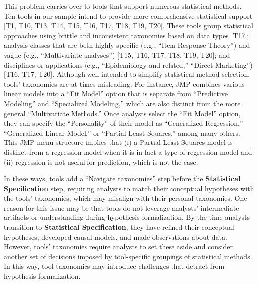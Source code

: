 This problem carries over to tools that support numerous statistical methods.
Ten tools in our sample intend to provide more comprehensive statistical support
[T1, T10, T13, T14, T15, T16, T17, T18, T19, T20]. These tools group statistical
approaches using brittle and inconsistent taxonomies based on data types [T17];
analysis classes that are both highly specific (e.g., ``Item
Response Theory'') and vague (e.g., ``Multivariate analyses'') [T15, T16, T17,
T18, T19, T20]; and disciplines or applications (e.g., ``Epidemiology and
related,'' ``Direct Marketing'') [T16, T17, T20]. Although well-intended to
simplify statistical method selection, tools' taxonomies are at times
misleading. For instance, JMP combines various linear models into a ``Fit
Model'' option that is separate from ``Predictive Modeling'' and ``Specialized
Modeling,'' which are also distinct from the more general ``Multivariate
Methods.'' Once analysts select the ``Fit Model'' option, they can specify the
``Personality'' of their model as ``Generalized Regression,'' ``Generalized
Linear Model,'' or ``Partial Least Squares,'' among many others. This JMP menu
structure implies that (i) a Partial Least Squares model
is distinct from a regression model when it is in fact a type of regression
model and (ii) regression is not useful for prediction, which is not the case. 

In these ways, tools add a ``Navigate taxonomies'' step before the
\textbf{Statistical Specification} step, requiring analysts to match their
conceptual hypotheses with the tools' taxonomies, which may misalign with their personal taxonomies. One reason for this issue may be that tools do
not leverage analysts' intermediate artifacts or understanding during hypothesis
formalization. By the time analysts transition to \textbf{Statistical
Specification}, they have refined their conceptual hypotheses, developed causal
models, and made observations about data. However, tools' taxonomies require
analysts to set these aside and consider another set of decisions imposed by
tool-specific groupings of statistical methods. In this way, tool taxonomies may introduce challenges that detract from hypothesis
formalization.


